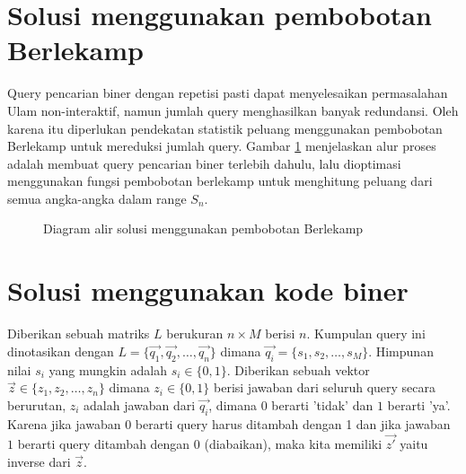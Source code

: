 \section{Solusi menggunakan pembobotan Berlekamp}

Query pencarian biner dengan repetisi pasti dapat menyelesaikan permasalahan Ulam non-interaktif, namun jumlah query menghasilkan banyak redundansi. Oleh karena itu diperlukan pendekatan statistik peluang menggunakan pembobotan Berlekamp untuk mereduksi jumlah query. Gambar \ref{fig:flow_berlekamp} menjelaskan alur proses adalah membuat query pencarian biner terlebih dahulu, lalu dioptimasi menggunakan fungsi pembobotan berlekamp untuk menghitung peluang dari semua angka-angka dalam range $S_n$.

\begin{figure}
\centering
\caption{Diagram alir solusi menggunakan pembobotan Berlekamp}
\label{fig:flow_berlekamp}
\end{figure}


\section{Solusi menggunakan kode biner}

Diberikan sebuah matriks $L$ berukuran $n \times M$ berisi $n$. Kumpulan query ini dinotasikan dengan $L = \{\vec{q_1},\vec{q_2},\ldots,\vec{q_n}\}$ dimana $\vec{q_i} = \{s_1,s_2,\ldots,s_M\}$. Himpunan nilai $s_i$ yang mungkin adalah $s_i \in \{0,1\}$. Diberikan sebuah vektor $\vec{z} \in \{z_1,z_2,\ldots,z_n\}$ dimana $z_i \in \{0,1\}$ berisi jawaban dari seluruh query secara berurutan, $z_i$ adalah jawaban dari $\vec{q_i}$, dimana $0$ berarti 'tidak' dan $1$ berarti 'ya'. Karena jika jawaban $0$ berarti query harus ditambah dengan 1 dan jika jawaban $1$ berarti query ditambah dengan 0 (diabaikan), maka kita memiliki $\vec{z'}$ yaitu inverse dari $\vec{z}$. 

